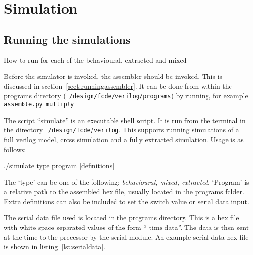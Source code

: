 
\section{Simulation}

\subsection{Running the simulations}



How to run for each of the behavioural, extracted and mixed

Before the simulator is invoked, the assembler should be invoked. 
This is discussed in section~\ref{sect:runningassembler}. 
It can be done from within the programs directory (\texttt{~/design/fcde/verilog/programs}) by running, for example \texttt{assemble.py multiply}

The script ``simulate'' is an executable shell script. 
It is run from the terminal in the directory \texttt{~/design/fcde/verilog}. 
This supports running simulations of a full verilog model, cross simulation and a fully extracted simulation. 
Usage is as follows:\\
\begin{center}
./simulate type program [definitions] 
\end{center}

The `type' can be one of the following: \textit{behavioural, mixed, extracted}.
`Program' is a relative path to the assembled hex file, usually located in the programs folder. 
Extra definitions can also be included to set the switch value or serial data input.

The serial data file used is located in the programs directory. 
This is a hex file with white space separated values of the form `` time data''. 
The data is then sent at the time to the processor by the serial module. 
An example serial data hex file is shown in listing~\ref{lst:serialdata}.



